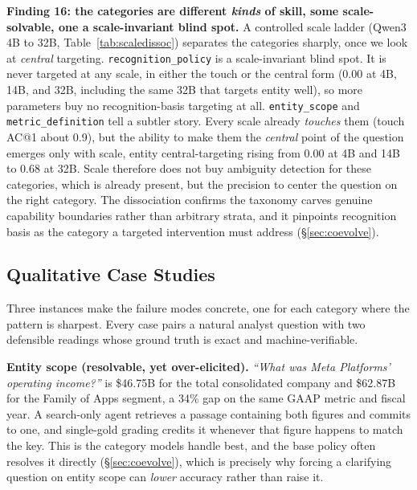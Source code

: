 \textbf{Finding 16: the categories are different \emph{kinds} of skill, some
scale-solvable, one a scale-invariant blind spot.} A controlled scale ladder
(Qwen3 4B to 32B, Table~\ref{tab:scaledissoc}) separates the categories
sharply, once we look at \emph{central} targeting. \texttt{recognition\_policy} is a
scale-invariant blind spot. It is never targeted at any scale, in either the touch or the
central form (0.00 at 4B, 14B, and 32B, including the same 32B that targets entity well),
so more parameters buy no recognition-basis targeting at all. \texttt{entity\_scope} and
\texttt{metric\_definition} tell a subtler story. Every scale already \emph{touches} them
(touch AC@1 about 0.9), but the ability to make them the \emph{central} point of the
question emerges only with scale, entity central-targeting rising from 0.00 at 4B and 14B to
0.68 at 32B. Scale therefore does not buy ambiguity detection for these categories, which is
already present, but the precision to center the question on the right category. The dissociation
confirms the taxonomy carves genuine capability boundaries rather than arbitrary strata, and
it pinpoints recognition basis as the category a targeted intervention must address
(\S\ref{sec:coevolve}).

\subsection{Qualitative Case Studies}
\label{sec:casestudies}

Three instances make the failure modes concrete, one for each category where the pattern
is sharpest. Every case pairs a natural analyst question with two defensible readings
whose ground truth is exact and machine-verifiable.

\textbf{Entity scope (resolvable, yet over-elicited).} \emph{``What was Meta
Platforms' operating income?''} is \$46.75B for the total consolidated company and
\$62.87B for the Family of Apps segment, a 34\% gap on the same GAAP metric and
fiscal year. A search-only agent retrieves a passage containing both figures and
commits to one, and single-gold grading credits it whenever that figure happens to
match the key. This is the category models handle best, and the base policy often
resolves it directly (\S\ref{sec:coevolve}), which is precisely why forcing a
clarifying question on entity scope can \emph{lower} accuracy rather than raise it.

